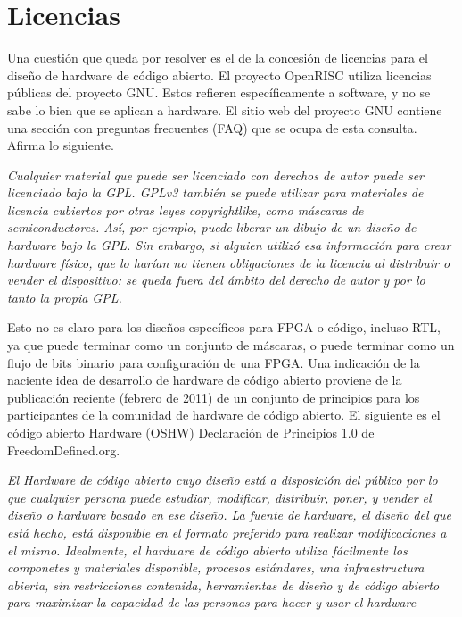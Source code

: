 \section{Licencias}

Una cuestión que queda por resolver es el de la concesión de licencias para el diseño de hardware de código abierto. El proyecto OpenRISC utiliza licencias públicas del proyecto GNU. Estos refieren específicamente a software, y no se sabe lo bien que se aplican a hardware.
El sitio web del proyecto GNU contiene una sección con preguntas frecuentes (FAQ) que se ocupa de esta consulta. Afirma lo siguiente.

\textit{Cualquier material que puede ser licenciado con derechos de autor puede ser licenciado bajo la GPL.
GPLv3 también se puede utilizar para materiales de licencia cubiertos por otras leyes copyrightlike, como máscaras de semiconductores. Así, por ejemplo, puede liberar un dibujo de un diseño de hardware bajo la GPL. Sin embargo, si
alguien utilizó esa información para crear hardware físico, que lo harían
no tienen obligaciones de la licencia al distribuir o vender el dispositivo: se
queda fuera del ámbito del derecho de autor y por lo tanto la propia GPL.}

Esto no es claro para los diseños específicos para FPGA o código, incluso RTL, ya que puede terminar como un conjunto de máscaras, o puede terminar como un flujo de bits binario para configuración de una FPGA.
Una indicación de la naciente idea de desarrollo de hardware de código abierto proviene de la publicación reciente (febrero de 2011) de un conjunto de principios para los participantes de la comunidad de hardware de código abierto. El siguiente es el código abierto Hardware (OSHW) Declaración de Principios 1.0 de FreedomDefined.org.

\textit{El Hardware de código abierto cuyo diseño está a disposición del público
por lo que cualquier persona puede estudiar, modificar, distribuir, poner, y vender el
diseño o hardware basado en ese diseño. La fuente de hardware, el diseño
del que está hecho, está disponible en el formato preferido para realizar
modificaciones a el mismo. Idealmente, el hardware de código abierto utiliza fácilmente los componetes y materiales disponible, procesos estándares, una infraestructura abierta, sin restricciones
contenida, herramientas de diseño y de código abierto para maximizar la capacidad
de las personas para hacer y usar el hardware} \cite{Etiqueta11}


